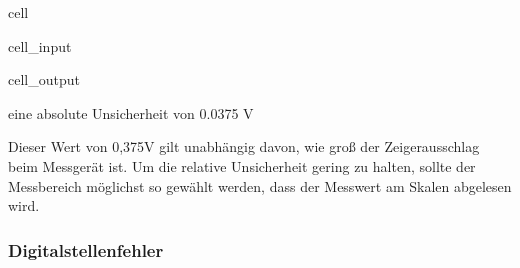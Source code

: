 \documentclass[letterpaper,10pt,english]{jupyterBook}
\begin{document}
\begin{sphinxuseclass}{cell}\begin{sphinxVerbatimInput}

\begin{sphinxuseclass}{cell_input}
\begin{sphinxVerbatim}[commandchars=\\\{\}]
  
  
  
\end{sphinxVerbatim}

\end{sphinxuseclass}\end{sphinxVerbatimInput}
\begin{sphinxVerbatimOutput}

\begin{sphinxuseclass}{cell_output}
\begin{sphinxVerbatim}[commandchars=\\\{\}]
eine absolute Unsicherheit von  0.0375 V
\end{sphinxVerbatim}

\end{sphinxuseclass}\end{sphinxVerbatimOutput}

\end{sphinxuseclass}
\sphinxAtStartPar
Dieser Wert von 0,375V gilt unabhängig davon, wie groß der Zeigerausschlag beim Messgerät ist. Um die relative Unsicherheit gering zu halten, sollte der Messbereich möglichst so gewählt werden, dass der Messwert am Skalen abgelesen wird.


\subsubsection{Digitalstellenfehler}
\label{\detokenize{content/1_Messunsicherheiten:digitalstellenfehler}}
\sphinxAtStartPar
{}
\end{document}
